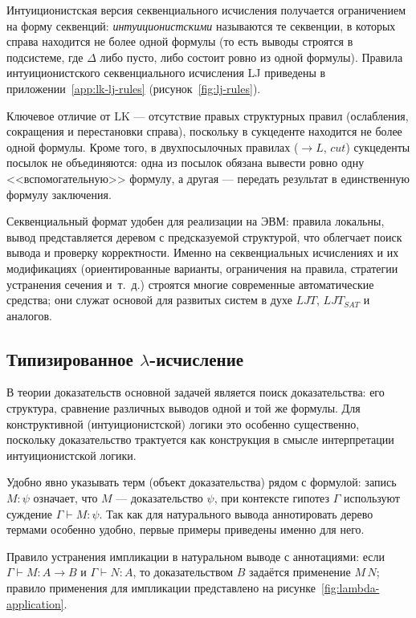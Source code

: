 \documentclass[14pt, russian]{scrartcl}
\begin{document}
Интуиционистская версия секвенциального исчисления получается ограничением на
форму секвенций: \emph{интуиционистскими} называются те секвенции, в которых
справа находится не более одной формулы (то есть выводы строятся в подсистеме,
где $\Delta$ либо пусто, либо состоит ровно из одной формулы). Правила
интуиционистского секвенциального исчисления LJ приведены в
приложении~\ref{app:lk-lj-rules} (рисунок~\ref{fig:lj-rules}).

Ключевое отличие от LK --- отсутствие правых структурных правил (ослабления,
сокращения и перестановки справа), поскольку в сукцеденте находится не более
одной формулы. Кроме того, в двухпосылочных правилах ($\rightarrow L$, $cut$)
сукцеденты посылок не объединяются: одна из посылок обязана вывести ровно одну
<<вспомогательную>> формулу, а другая --- передать результат в единственную
формулу заключения.

Секвенциальный формат удобен для реализации на ЭВМ: правила локальны, вывод
представляется деревом с предсказуемой структурой, что облегчает поиск вывода и
проверку корректности. Именно на секвенциальных исчислениях и их модификациях
(ориентированные варианты, ограничения на правила, стратегии устранения сечения
и~т.~д.) строятся многие современные автоматические средства; они служат основой
для развитых систем в духе $LJT$, $LJT_{SAT}$ и аналогов.

\subsection{Типизированное \texorpdfstring{$\lambda$-исчисление}{лямбда-исчисление}}

В теории доказательств основной задачей является поиск доказательства: его
структура, сравнение различных выводов одной и той же формулы. Для
конструктивной (интуиционистской) логики это особенно существенно, поскольку
доказательство трактуется как конструкция в смысле интерпретации
интуиционистской логики.

Удобно явно указывать терм (объект доказательства) рядом с формулой: запись
$M : \psi$ означает, что $M$ --- доказательство $\psi$, при контексте гипотез
$\Gamma$ используют суждение $\Gamma \vdash M : \psi$. Так как для натурального вывода
аннотировать дерево термами особенно удобно, первые примеры приведены именно для него.

Правило устранения импликации в натуральном выводе с аннотациями: если
$\Gamma \vdash M : A \rightarrow B$ и $\Gamma \vdash N : A$, то доказательством $B$ задаётся применение $M\,N$; правило применения для импликации представлено на рисунке~\ref{fig:lambda-application}.
\end{document}
